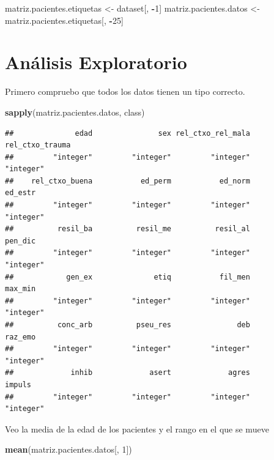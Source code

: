 \documentclass[]{article}
\newenvironment{Shaded}{\begin{snugshade}}{\end{snugshade}}
\newcommand{\KeywordTok}[1]{\textcolor[rgb]{0.13,0.29,0.53}{\textbf{#1}}}
\newcommand{\DecValTok}[1]{\textcolor[rgb]{0.00,0.00,0.81}{#1}}
\newcommand{\StringTok}[1]{\textcolor[rgb]{0.31,0.60,0.02}{#1}}
\newcommand{\OperatorTok}[1]{\textcolor[rgb]{0.81,0.36,0.00}{\textbf{#1}}}
\newcommand{\NormalTok}[1]{#1}
\begin{document}
\begin{Shaded}
\begin{Highlighting}[]
\NormalTok{matriz.pacientes.etiquetas <-}\StringTok{ }\NormalTok{dataset[, }\OperatorTok{-}\DecValTok{1}\NormalTok{]}
\NormalTok{matriz.pacientes.datos <-}\StringTok{ }\NormalTok{matriz.pacientes.etiquetas[, }\OperatorTok{-}\DecValTok{25}\NormalTok{]}
\end{Highlighting}
\end{Shaded}

\section{Análisis Exploratorio}\label{analisis-exploratorio}

Primero compruebo que todos los datos tienen un tipo correcto.

\begin{Shaded}
\begin{Highlighting}[]
\KeywordTok{sapply}\NormalTok{(matriz.pacientes.datos, class)}
\end{Highlighting}
\end{Shaded}

\begin{verbatim}
##              edad               sex rel_ctxo_rel_mala   rel_ctxo_trauma 
##         "integer"         "integer"         "integer"         "integer" 
##    rel_ctxo_buena           ed_perm           ed_norm           ed_estr 
##         "integer"         "integer"         "integer"         "integer" 
##          resil_ba          resil_me          resil_al           pen_dic 
##         "integer"         "integer"         "integer"         "integer" 
##            gen_ex              etiq           fil_men           max_min 
##         "integer"         "integer"         "integer"         "integer" 
##          conc_arb          pseu_res               deb           raz_emo 
##         "integer"         "integer"         "integer"         "integer" 
##             inhib             asert             agres            impuls 
##         "integer"         "integer"         "integer"         "integer"
\end{verbatim}

Veo la media de la edad de los pacientes y el rango en el que se mueve

\begin{Shaded}
\begin{Highlighting}[]
\KeywordTok{mean}\NormalTok{(matriz.pacientes.datos[, }\DecValTok{1}\NormalTok{])}
\end{Highlighting}
\end{Shaded}
\end{document}
